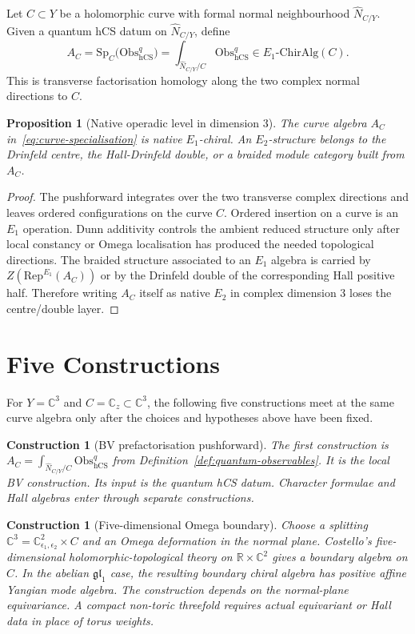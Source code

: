 \documentclass[11pt]{article}
\newtheorem{proposition}[theorem]{Proposition}
\newtheorem{construction}[theorem]{Construction}
\theoremstyle{remark}
\providecommand{\C}{\mathbb{C}}
\providecommand{\R}{\mathbb{R}}
\providecommand{\fgl}{\mathfrak{gl}}
\providecommand{\Obs}{\mathrm{Obs}}
\providecommand{\hCS}{\mathrm{hCS}}
\providecommand{\Eone}{E_1}
\providecommand{\Etwo}{E_2}
\providecommand{\Sp}{\mathrm{Sp}}
\begin{document}
Let $C\subset Y$ be a holomorphic curve with formal normal
neighbourhood $\widehat N_{C/Y}$.  Given a quantum hCS datum on
$\widehat N_{C/Y}$, define
\[
  A_C
  =
  \Sp_C\bigl(\Obs^q_{\hCS}\bigr)
  =
  \int_{\widehat N_{C/Y}/C}\Obs^q_{\hCS}
  \in \Eone\text{-}\mathrm{ChirAlg}(C).
  \label{eq:curve-specialisation}
\]
This is transverse factorisation homology along the two complex normal
directions to $C$.

\begin{proposition}[Native operadic level in dimension $3$]
\label{prop:native-e1}
The curve algebra $A_C$ in~\eqref{eq:curve-specialisation} is native
$\Eone$-chiral.  An $\Etwo$-structure belongs to the Drinfeld centre,
the Hall-Drinfeld double, or a braided module category built from
$A_C$.
\end{proposition}

\begin{proof}
The pushforward integrates over the two transverse complex directions
and leaves ordered configurations on the curve $C$.  Ordered insertion
on a curve is an $\Eone$ operation.  Dunn additivity controls the
ambient reduced structure only after local constancy or Omega
localisation has produced the needed topological directions.  The
braided structure associated to an $\Eone$ algebra is carried by
$Z(\mathrm{Rep}^{\Eone}(A_C))$ or by the Drinfeld double of the
corresponding Hall positive half.  Therefore writing $A_C$ itself as
native $\Etwo$ in complex dimension $3$ loses the centre/double layer.
\end{proof}

\section{Five Constructions}

For $Y=\C^3$ and $C=\C_z\subset\C^3$, the following five constructions
meet at the same curve algebra only after the choices and hypotheses
above have been fixed.

\begin{construction}[BV prefactorisation pushforward]
The first construction is
$A_C=\int_{\widehat N_{C/Y}/C}\Obs^q_{\hCS}$ from
Definition~\ref{def:quantum-observables}.  It is the local BV
construction.  Its input is the quantum hCS datum. Character formulae
and Hall algebras enter through separate constructions.
\end{construction}

\begin{construction}[Five-dimensional Omega boundary]
Choose a splitting $\C^3=\C^2_{\epsilon_1,\epsilon_2}\times C$ and an
Omega deformation in the normal plane.  Costello's five-dimensional
holomorphic-topological theory on $\R\times\C^2$ gives a boundary
algebra on $C$.  In the abelian $\fgl_1$ case, the resulting boundary
chiral algebra has positive affine Yangian mode algebra.  The
construction depends on the normal-plane equivariance.  A compact
non-toric threefold requires actual equivariant or Hall data in place of
torus weights.
\end{construction}
\end{document}
